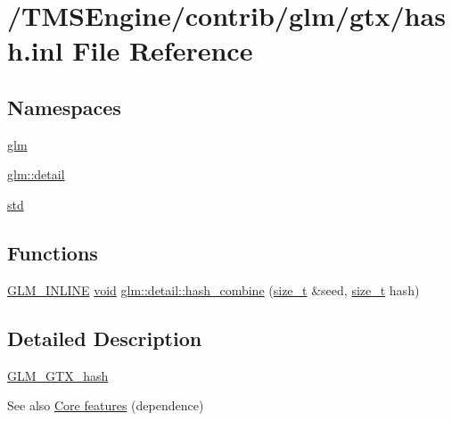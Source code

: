 \hypertarget{hash_8inl}{}\section{/\+T\+M\+S\+Engine/contrib/glm/gtx/hash.inl File Reference}
\label{hash_8inl}
\subsection*{Namespaces}
\begin{DoxyCompactItemize}
\item 
 \hyperlink{namespaceglm}{glm}
\item 
 \hyperlink{namespaceglm_1_1detail}{glm\+::detail}
\item 
 \hyperlink{namespacestd}{std}
\end{DoxyCompactItemize}
\subsection*{Functions}
\begin{DoxyCompactItemize}
\item 
\hyperlink{setup_8hpp_a4603970cbd724c5d102bbcf17f430047}{G\+L\+M\+\_\+\+I\+N\+L\+I\+NE} \hyperlink{_s_d_l__opengles2__gl2ext_8h_ae5d8fa23ad07c48bb609509eae494c95}{void} \hyperlink{namespaceglm_1_1detail_a391b3eb8d7f4662a1b31046bd69f2755}{glm\+::detail\+::hash\+\_\+combine} (\hyperlink{_s_d_l__config_8h_a7c94ea6f8948649f8d181ae55911eeaf}{size\+\_\+t} \&seed, \hyperlink{_s_d_l__config_8h_a7c94ea6f8948649f8d181ae55911eeaf}{size\+\_\+t} hash)
\end{DoxyCompactItemize}


\subsection{Detailed Description}
\hyperlink{group__gtx__hash}{G\+L\+M\+\_\+\+G\+T\+X\+\_\+hash}

\begin{DoxySeeAlso}{See also}
\hyperlink{group__core}{Core features} (dependence) 
\end{DoxySeeAlso}
